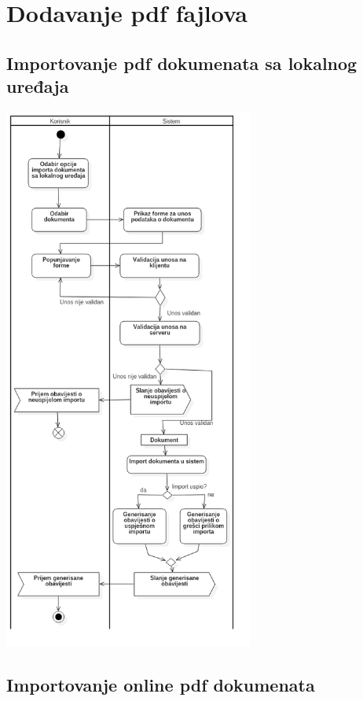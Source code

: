 \section{Dodavanje pdf fajlova}

\subsection{Importovanje pdf dokumenata sa lokalnog uređaja}

\begin{center}
    \includegraphics[height=18cm]{images/ImportovanjeSaLokalnogUredjaja.png}  
\end{center}

\subsection{Importovanje online pdf dokumenata}

